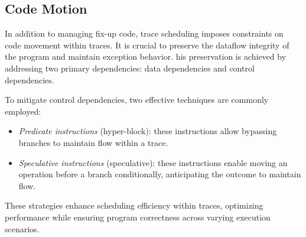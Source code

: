 \subsection{Code Motion}
In addition to managing fix-up code, trace scheduling imposes constraints on code movement within traces. 
It is crucial to preserve the dataflow integrity of the program and maintain exception behavior. 
his preservation is achieved by addressing two primary dependencies: data dependencies and control dependencies.

To mitigate control dependencies, two effective techniques are commonly employed:
\begin{itemize}
    \item \textit{Predicate instructions} (hyper-block): these instructions allow bypassing branches to maintain flow within a trace.
    \item \textit{Speculative instructions} (speculative): these instructions enable moving an operation before a branch conditionally, anticipating the outcome to maintain flow.
\end{itemize}
These strategies enhance scheduling efficiency within traces, optimizing performance while ensuring program correctness across varying execution scenarios.